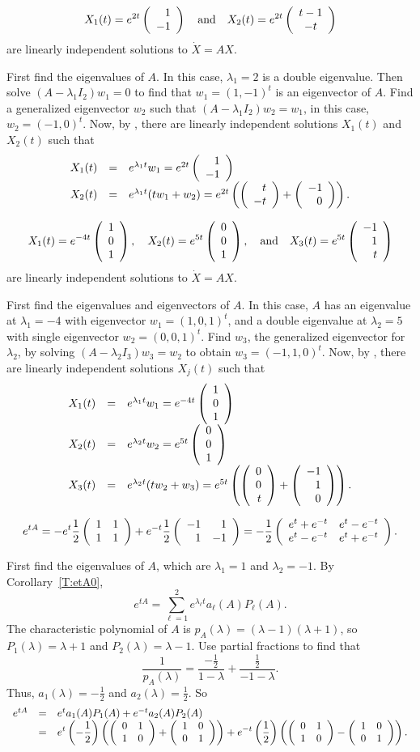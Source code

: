  \ans
\[
X_1(t) = e^{2t}\left(\begin{array}{r} 1 \\ -1\end{array}\right) \quad\mbox{and}\quad
X_2(t) = e^{2t}\left(\begin{array}{c} t - 1 \\ -t\end{array}\right)
\]
are linearly independent solutions to $\dot{X} = AX$.

\soln First find the eigenvalues of $A$.  In this case, $\lambda_1 = 2$
is a double eigenvalue.  Then solve $(A - \lambda_1 I_2)w_1 = 0$ to
find that $w_1 = (1,-1)^t$ is an eigenvector of $A$.  Find a
generalized eigenvector $w_2$ such that $(A - \lambda_1 I_2)w_2 =
w_1$, in this case, $w_2 = (-1,0)^t$.  Now, by ,
there are linearly independent solutions $X_1(t)$ and $X_2(t)$ such that
\[
\begin{array}{rcl}
X_1(t) & = & e^{\lambda_1 t}w_1 = e^{2t}\left(\begin{array}{r} 1 \\ -1\end{array}\right) \\
X_2(t) & = & e^{\lambda_1 t}(tw_1 + w_2) = e^{2t}\left(\left(\begin{array}{r} t \\ -t\end{array}\right) +
\left(\begin{array}{r} -1 \\ 0\end{array}\right)\right).
\end{array}
\]

 \ans
\[
X_1(t) = e^{-4t}\left(\begin{array}{r} 1 \\ 0 \\ 1\end{array}\right), \quad
X_2(t) = e^{5t}\left(\begin{array}{r} 0 \\ 0 \\ 1\end{array}\right), \quad\mbox{and}\quad
X_3(t) = e^{5t}\left(\begin{array}{r} -1 \\ 1 \\ t\end{array}\right)
\]
are linearly independent solutions to $\dot{X} = AX$.

\soln First find the eigenvalues and eigenvectors of $A$.  In this case,
$A$ has an eigenvalue at $\lambda_1 = -4$ with eigenvector $w_1 =
(1,0,1)^t$, and a double eigenvalue at $\lambda_2 = 5$ with single
eigenvector $w_2 = (0,0,1)^t$.  Find $w_3$, the generalized
eigenvector for $\lambda_2$, by solving $(A - \lambda_2 I_3)w_3 = w_2$
to obtain $w_3 = (-1,1,0)^t$.  Now, by ,
there are linearly independent solutions $X_j(t)$ such that
\[
\begin{array}{rcl}
X_1(t) & = & e^{\lambda_1 t}w_1 = e^{-4t}\left(\begin{array}{r} 1 \\ 0 \\ 1\end{array}\right) \\
X_2(t) & = & e^{\lambda_2 t}w_2 = e^{5t}\left(\begin{array}{r} 0 \\ 0 \\ 1\end{array}\right) \\
X_3(t) & = & e^{\lambda_2 t}(tw_2 + w_3) = e^{5t}\left(\left(\begin{array}{r} 0 \\ 0 \\ t\end{array}\right)
+ \left(\begin{array}{r} -1 \\ 1 \\ 0\end{array}\right)\right).
\end{array}
\]

 \ans
\[
e^{tA} = -e^t\frac{1}{2}\left(\begin{array}{rr} 1 & 1\\ 1 &1\end{array}\right) +
e^{-t}\frac{1}{2}\left(\begin{array}{rr} -1 & 1\\ 1 &-1\end{array}\right)
= -\frac{1}{2}\left(\begin{array}{cc} e^{t} + e^{-t} & e^t - e^{-t}\\ e^t - e^{-t} &e^t + e^{-t}\end{array}\right).
\]

\soln First find the eigenvalues of $A$, which are $\lambda_1 = 1$ and
$\lambda_2 = -1$.  By Corollary~\ref{T:etA0},
\[
e^{tA} = \sum_{\ell = 1}^2 e^{\lambda_\ell t}a_\ell(A)P_\ell(A).
\]
The characteristic polynomial of $A$ is $p_A(\lambda) = (\lambda -
1)(\lambda + 1)$, so $P_1(\lambda) = \lambda + 1$ and $P_2(\lambda) =
\lambda - 1$.  Use partial fractions to find that
\[
\frac{1}{p_A(\lambda)} = \frac{-\frac{1}{2}}{1 - \lambda} + \frac{\frac{1}{2}}
{-1 - \lambda}.
\]
Thus, $a_1(\lambda) = -\frac{1}{2}$ and $a_2(\lambda) = \frac{1}{2}$.  So
\[
\begin{array}{rcl}
e^{tA} & = & e^ta_1(A)P_1(A) + e^{-t}a_2(A)P_2(A) \\
& = & \displaystyle e^t\left(-\frac{1}{2}\right)\left(\left(\begin{array}{rr} 0 & 1\\ 1 &0\end{array}\right) +
\left(\begin{array}{rr} 1 & 0\\ 0 &1\end{array}\right)\right) + e^{-t}\left(\frac{1}{2}\right)
\left(\left(\begin{array}{rr} 0 & 1\\ 1 &0\end{array}\right) - \left(\begin{array}{rr} 1 & 0\\ 0 &1\end{array}\right)\right).
\end{array}
\]

